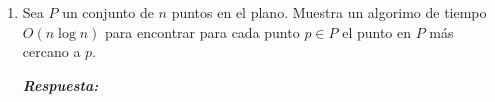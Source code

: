 \documentclass[11pt,letterpaper]{article}
\newcommand\respuesta{\textbf{\textit{Respuesta: }}}
\begin{document}
\begin{enumerate}[leftmargin=*]
    \begin{enumerate}[label=\alph*)]
        \item Prueba que el conjunto de vértices de la triangulación de Delaunay de $P$ contiene un EMST para $P$.
        
        \respuesta

        \item Usa el resultado anterior pra dar un algorimo $O (n \log n)$ para computar un EMST para $P$.
        
        \respuesta

    \end{enumerate}

    \item Sea $P$ un conjunto de $n$ puntos en el plano.
    Muestra un algorimo de tiempo $O (n \log n)$ para encontrar para cada punto $p \in P$ el punto en $P$ más cercano a $p$. 
    
    \respuesta

  \end{enumerate}
\end{document}
